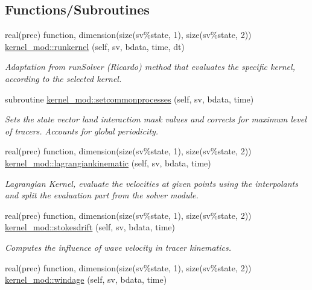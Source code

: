 \subsection*{Functions/\+Subroutines}
\begin{DoxyCompactItemize}
\item 
real(prec) function, dimension(size(sv\%state, 1), size(sv\%state, 2)) \mbox{\hyperlink{namespacekernel__mod_ae17673ed6d32a4e7f6e54276e6430cc9}{kernel\+\_\+mod\+::runkernel}} (self, sv, bdata, time, dt)
\begin{DoxyCompactList}\small\item\em Adaptation from run\+Solver (Ricardo) method that evaluates the specific kernel, according to the selected kernel. \end{DoxyCompactList}\item 
subroutine \mbox{\hyperlink{namespacekernel__mod_a1032cd0a40cff8301fcf2ca880c81039}{kernel\+\_\+mod\+::setcommonprocesses}} (self, sv, bdata, time)
\begin{DoxyCompactList}\small\item\em Sets the state vector land interaction mask values and corrects for maximum level of tracers. Accounts for global periodicity. \end{DoxyCompactList}\item 
real(prec) function, dimension(size(sv\%state, 1), size(sv\%state, 2)) \mbox{\hyperlink{namespacekernel__mod_a7a181eab538ac32b3bddcf4bb34503bd}{kernel\+\_\+mod\+::lagrangiankinematic}} (self, sv, bdata, time)
\begin{DoxyCompactList}\small\item\em Lagrangian Kernel, evaluate the velocities at given points using the interpolants and split the evaluation part from the solver module. \end{DoxyCompactList}\item 
real(prec) function, dimension(size(sv\%state, 1), size(sv\%state, 2)) \mbox{\hyperlink{namespacekernel__mod_a69811135e6a881c537873c59451f689e}{kernel\+\_\+mod\+::stokesdrift}} (self, sv, bdata, time)
\begin{DoxyCompactList}\small\item\em Computes the influence of wave velocity in tracer kinematics. \end{DoxyCompactList}\item 
real(prec) function, dimension(size(sv\%state, 1), size(sv\%state, 2)) \mbox{\hyperlink{namespacekernel__mod_ae9cf0f11335d49476ce48a37c2fbde83}{kernel\+\_\+mod\+::windage}} (self, sv, bdata, time)

\end{DoxyCompactItemize}

